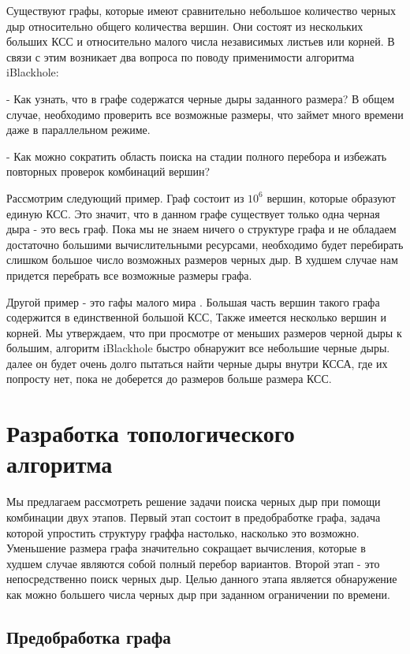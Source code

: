 \documentclass[12pt,a4paper,oneside]{article}
\theoremstyle{definition}
\theoremstyle{lemma}
\theoremstyle{remark}
\begin{document}
Существуют графы, которые имеют сравнительно небольшое количество черных дыр относительно общего количества вершин. Они состоят из нескольких больших КСС и относительно малого числа независимых листьев или корней. В связи с этим возникает два вопроса по поводу применимости алгоритма iBlackhole:

    - Как узнать, что в графе содержатся черные дыры заданного размера? В общем случае, необходимо проверить все возможные размеры, что займет много времени даже в параллельном режиме.

    - Как можно сократить область поиска на стадии полного перебора и избежать повторных проверок комбинаций вершин?

Рассмотрим следующий пример. Граф состоит из $10^6$ вершин, которые образуют единую КСС. Это значит, что в данном графе существует только одна черная дыра - это весь граф. Пока мы не знаем ничего о структуре графа и не обладаем достаточно большими вычислительными ресурсами, необходимо будет перебирать слишком большое число возможных размеров черных дыр. В худшем случае нам придется перебрать все возможные размеры графа.

Другой пример - это гафы малого мира \cite{watts1999networks}. Большая часть вершин такого графа содержится в единственной большой КСС, Также имеется несколько вершин и корней. Мы утверждаем, что при просмотре от меньших размеров черной дыры к большим, алгоритм iBlackhole быстро обнаружит все небольшие черные дыры. далее он будет очень долго пытаться найти черные дыры внутри КССА, где их попросту нет, пока не доберется до размеров больше размера КСС.

\cleardoublepage
\section{Разработка топологического алгоритма}\label{sec:topalgodesign}

Мы предлагаем рассмотреть решение задачи поиска черных дыр при помощи комбинации двух этапов. Первый этап состоит в предобработке графа, задача которой упростить структуру граффа настолько, насколько это возможно. Уменьшение размера графа значительно сокращает вычисления, которые в худшем случае являются собой полный перебор вариантов. Второй этап - это непосредственно поиск черных дыр. Целью данного этапа является обнаружение как можно большего числа черных дыр при заданном ограничении по времени.

\subsection{Предобработка графа}\label{subsec:graphpreprocessing}
\end{document}
